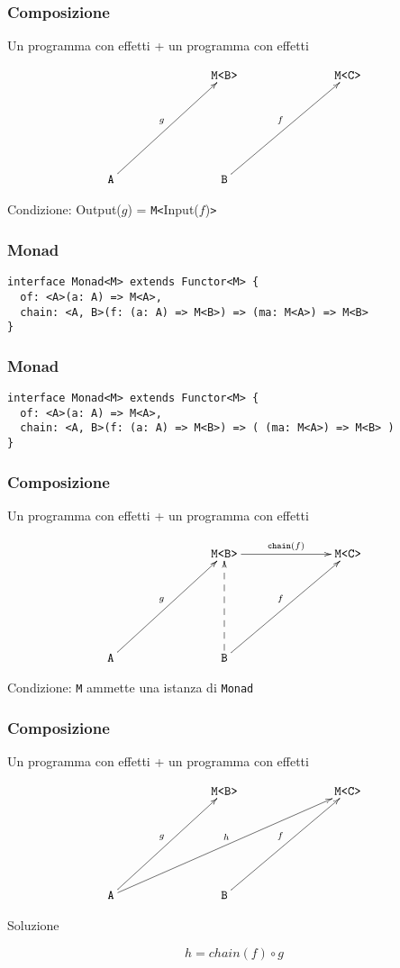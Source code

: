 \documentclass{beamer}
\begin{document}
\begin{frame}
\frametitle{Composizione}

Un programma con effetti + un programma con effetti

\[
\xymatrixrowsep{2.5cm}
\xymatrixcolsep{2.5cm}
\xymatrix{
  & \texttt{M<B>} & \texttt{M<C>} \\
  \texttt{A} \ar[ur]^{g} & \texttt{B} \ar[ur]^{f}
}
\]

Condizione: Output($g$) = \texttt{M<}Input($f$)\texttt{>}

\end{frame}

\begin{frame}[fragile]
\frametitle{Monad}

\begin{verbatim}
interface Monad<M> extends Functor<M> {
  of: <A>(a: A) => M<A>,
  chain: <A, B>(f: (a: A) => M<B>) => (ma: M<A>) => M<B>
}
\end{verbatim}

\end{frame}

\begin{frame}[fragile]
\frametitle{Monad}

\begin{verbatim}
interface Monad<M> extends Functor<M> {
  of: <A>(a: A) => M<A>,
  chain: <A, B>(f: (a: A) => M<B>) => ( (ma: M<A>) => M<B> )
}
\end{verbatim}

\end{frame}

\begin{frame}
\frametitle{Composizione}

Un programma con effetti + un programma con effetti

\[
\xymatrixrowsep{2.5cm}
\xymatrixcolsep{2.5cm}
\xymatrix{
  & \texttt{M<B>} \ar[r]^{\texttt{chain}(f)} & \texttt{M<C>} \\
  \texttt{A} \ar[ur]^{g} & \texttt{B} \ar[ur]^{f} \ar@{-->}[u]
}
\]

Condizione: \texttt{M} ammette una istanza di \texttt{Monad}

\end{frame}

\begin{frame}
\frametitle{Composizione}

Un programma con effetti + un programma con effetti

\[
\xymatrixrowsep{2.5cm}
\xymatrixcolsep{2.5cm}
\xymatrix{
  & \texttt{M<B>} & \texttt{M<C>} \\
  \texttt{A} \ar[ur]^{g} \ar[urr]^{h} & \texttt{B} \ar[ur]^{f}
}
\]

Soluzione

$$
h = chain(f) \circ g
$$

\end{frame}
\end{document}
